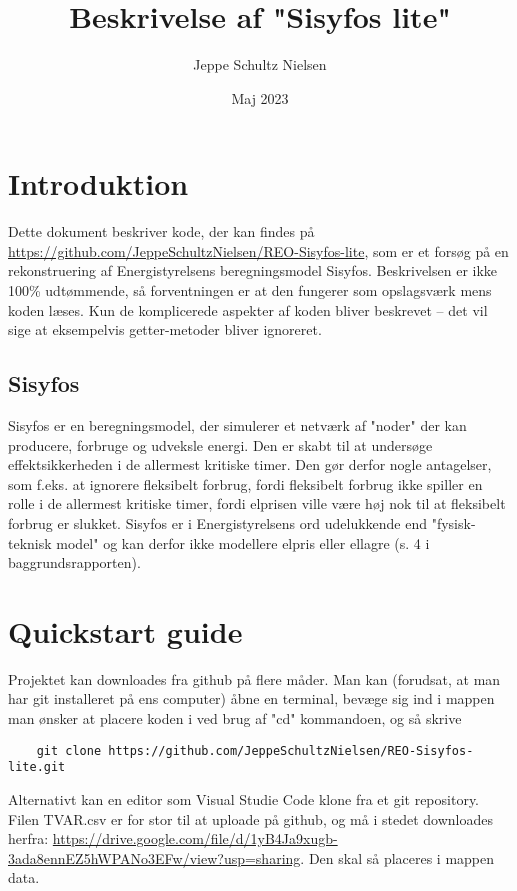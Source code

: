 \documentclass{article}
\title{Beskrivelse af "Sisyfos lite"}
\author{Jeppe Schultz Nielsen}
\date{Maj 2023}
\begin{document}
\maketitle
\tableofcontents

\section{Introduktion}
Dette dokument beskriver kode, der kan findes på \url{https://github.com/JeppeSchultzNielsen/REO-Sisyfos-lite}, som er et forsøg på en rekonstruering af Energistyrelsens beregningsmodel Sisyfos. Beskrivelsen er ikke 100\% udtømmende, så forventningen er at den fungerer som opslagsværk mens koden læses. Kun de komplicerede aspekter af koden bliver beskrevet -- det vil sige at eksempelvis getter-metoder bliver ignoreret. 
\subsection{Sisyfos}
Sisyfos er en beregningsmodel, der simulerer et netværk af "noder" der kan producere, forbruge og udveksle energi. Den er skabt til at undersøge effektsikkerheden i de allermest kritiske timer. Den gør derfor nogle antagelser, som f.eks. at ignorere fleksibelt forbrug, fordi fleksibelt forbrug ikke spiller en rolle i de allermest kritiske timer, fordi elprisen ville være høj nok til at fleksibelt forbrug er slukket. Sisyfos er i Energistyrelsens ord udelukkende end "fysisk-teknisk model" og kan derfor ikke modellere elpris eller ellagre (s. 4 i baggrundsrapporten).

\section{Quickstart guide}
Projektet kan downloades fra github på flere måder. Man kan (forudsat, at man har git installeret på ens computer) åbne en terminal, bevæge sig ind i mappen man ønsker at placere koden i ved brug af "cd" kommandoen, og så skrive
\begin{verbatim}
    git clone https://github.com/JeppeSchultzNielsen/REO-Sisyfos-lite.git
\end{verbatim}
Alternativt kan en editor som Visual Studie Code klone fra et git repository. Filen TVAR.csv er for stor til at uploade på github, og må i stedet downloades herfra: \url{https://drive.google.com/file/d/1yB4Ja9xugb-3ada8ennEZ5hWPANo3EFw/view?usp=sharing}. Den skal så placeres i mappen data. 
\end{document}
